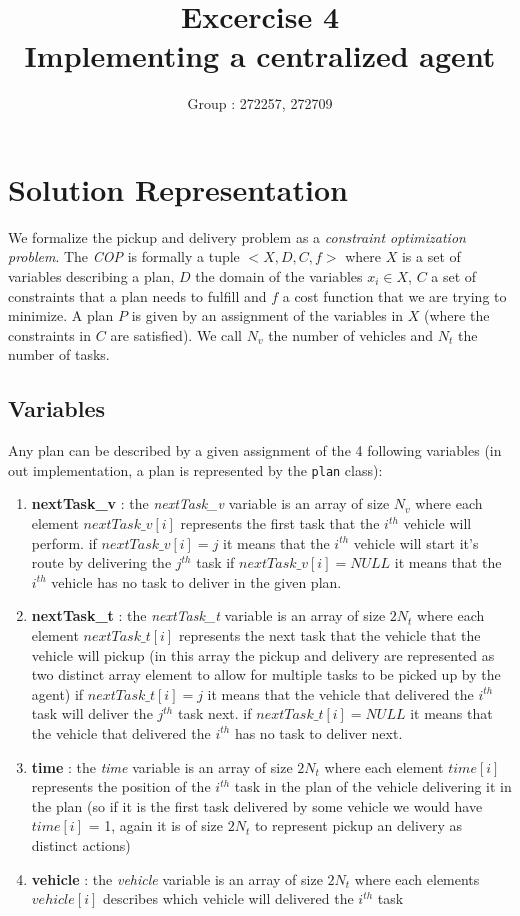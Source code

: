 \documentclass[11pt]{article}
\title{\bf Excercise 4\\ Implementing a centralized agent}
\author{Group \textnumero : 272257, 272709}
\begin{document}
\maketitle

\section{Solution Representation}

We formalize the pickup and delivery problem as a \textit{constraint optimization problem}. The \textit{COP} is formally a tuple $< X, D, C, f >$ where $X$ is a set of variables describing a plan, $D$ the domain of the variables $x_i \in X$, $C$ a set of constraints that a plan needs to fulfill and $f$ a cost function that we are trying to minimize. A plan $P$ is given by an assignment of the variables in $X$ (where the constraints in $C$ are satisfied). We call $N_v$ the number of vehicles and $N_t$ the number of tasks.


\subsection{Variables}
Any plan can be described by a given assignment of the 4 following variables (in out implementation, a plan is represented by the \texttt{plan} class):
\begin{enumerate}
    \item \textbf{nextTask\_v} : the \textit{nextTask\_v} variable is an array of size $N_v$ where each element $nextTask\_v[i]$ represents the first task that the $i^{th}$ vehicle will perform.
    \subitem if $nextTask\_v[i] = j$ it means that the $i^{th}$ vehicle will start it's route by delivering the $j^{th}$ task
    \subitem if $nextTask\_v[i] = NULL$  it means that the $i^{th}$ vehicle has no task to deliver in the given plan.
    \item \textbf{nextTask\_t} : the \textit{nextTask\_t} variable is an array of size $2 N_t$ where each element $nextTask\_t[i]$ represents the next task that the vehicle that the vehicle will pickup (in this array the pickup and delivery are represented as two distinct array element to allow for multiple tasks to be picked up by the agent)
    \subitem if $nextTask\_t[i] = j$ it means that the vehicle that delivered the $i^{th}$ task will deliver the $j^{th}$ task next.
    \subitem if $nextTask\_t[i] = NULL$  it means that the vehicle that delivered the $i^{th}$ has no task to deliver next.
    \item \textbf{time} : the \textit{time} variable is an array of size $2  N_t$ where each element $time[i]$ represents the position of the $i^{th}$ task in the plan of the vehicle delivering it in the plan (so if it is the first task delivered by some vehicle we would have $time[i]$ = 1, again it is of size $2  N_t$ to represent pickup an delivery as distinct actions)
    \item \textbf{vehicle} : the \textit{vehicle} variable is an array of size $2N_t$ where each elements $vehicle[i]$ describes which vehicle will delivered the $i^{th}$ task
\end{enumerate}
\end{document}
